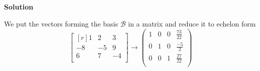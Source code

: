 \bf Solution \newline \newline 

We put the vectors forming the basis $ \mathcal{B} $ in a matrix and reduce it to echelon form
\[
\begin{bmatrix*}[r]
 1 & 2 & 3 \\
 -8 & -5 & 9 \\
 6 & 7 & -4 \\
\end{bmatrix*} → \left(\begin{array}{rrrr}1&0&0&\frac{73}{22} \\ 0&1&0&\frac{-5}{2}\\0&0&1&\frac{27}{22}\\\end{array}\right)
\]



    

        
